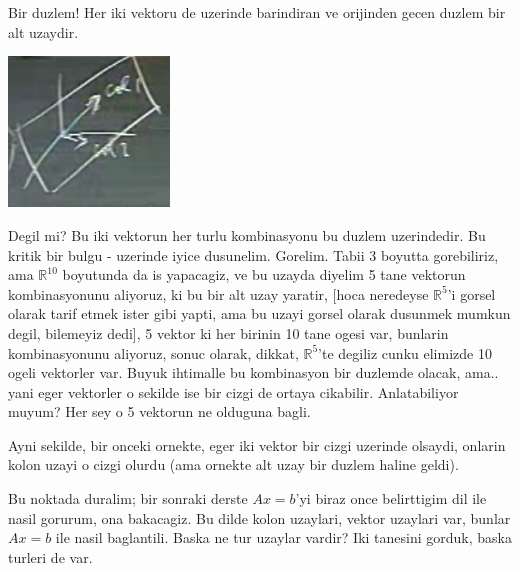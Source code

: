 \documentclass[12pt,fleqn]{article}\usepackage{../common}
\begin{document}
Bir duzlem! Her iki vektoru de uzerinde barindiran ve orijinden gecen
duzlem bir alt uzaydir.

\includegraphics[height=4cm]{5_06.png}

Degil mi? Bu iki vektorun her turlu kombinasyonu bu duzlem uzerindedir. Bu
kritik bir bulgu - uzerinde iyice dusunelim. Gorelim. Tabii 3 boyutta
gorebiliriz, ama $\mathbb{R}^{10}$ boyutunda da is yapacagiz, ve bu uzayda
diyelim 5 tane vektorun kombinasyonunu aliyoruz, ki bu bir alt uzay
yaratir, [hoca neredeyse $\mathbb{R}^5$'i gorsel olarak tarif etmek ister
gibi yapti, ama bu uzayi gorsel olarak dusunmek mumkun degil, bilemeyiz
dedi], 5 vektor ki her birinin 10 tane ogesi var, bunlarin kombinasyonunu
aliyoruz, sonuc olarak, dikkat, $\mathbb{R}^5$'te degiliz cunku elimizde 10
ogeli vektorler var. Buyuk ihtimalle bu kombinasyon bir duzlemde olacak,
ama.. yani eger vektorler o sekilde ise bir cizgi de ortaya
cikabilir. Anlatabiliyor muyum? Her sey o 5 vektorun ne olduguna bagli. 

Ayni sekilde, bir onceki ornekte, eger iki vektor bir cizgi uzerinde
olsaydi, onlarin kolon uzayi o cizgi olurdu (ama ornekte alt uzay bir
duzlem haline geldi). 

Bu noktada duralim; bir sonraki derste $Ax=b$'yi biraz once belirttigim dil
ile nasil gorurum, ona bakacagiz. Bu dilde kolon uzaylari, vektor uzaylari
var, bunlar $Ax=b$ ile nasil baglantili. Baska ne tur uzaylar vardir? Iki
tanesini gorduk, baska turleri de var. 
\end{document}
